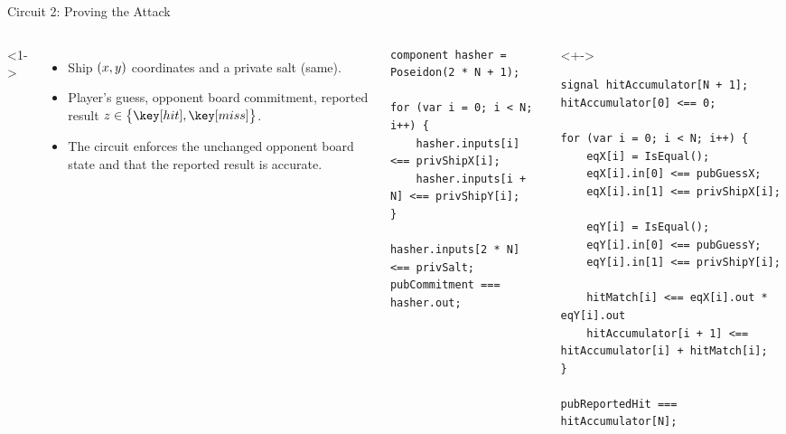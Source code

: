 \begin{frame}[fragile]{Circuit 2: Proving the Attack}
    \begin{columns}<1->
        \begin{itemize}
            \item {} Ship $\left(x, y\right)$ coordinates and a private salt (same).
            \item {} Player's guess, opponent board commitment, reported result $z \in \set{\hit, \miss}$.
            \item The circuit enforces the unchanged opponent board state and that the reported result is accurate.
        \end{itemize}
        \begin{verbatim}
component hasher = Poseidon(2 * N + 1);

for (var i = 0; i < N; i++) {
    hasher.inputs[i] <== privShipX[i];
    hasher.inputs[i + N] <== privShipY[i];
}

hasher.inputs[2 * N] <== privSalt;
pubCommitment === hasher.out;
        \end{verbatim}
        \vspace{-1em}
        \begin{uncoverenv}<+->
            \begin{verbatim}
signal hitAccumulator[N + 1];
hitAccumulator[0] <== 0;

for (var i = 0; i < N; i++) {
    eqX[i] = IsEqual();
    eqX[i].in[0] <== pubGuessX;
    eqX[i].in[1] <== privShipX[i];
    
    eqY[i] = IsEqual();
    eqY[i].in[0] <== pubGuessY;
    eqY[i].in[1] <== privShipY[i];

    hitMatch[i] <== eqX[i].out * eqY[i].out
    hitAccumulator[i + 1] <== hitAccumulator[i] + hitMatch[i];
}

pubReportedHit === hitAccumulator[N];
            \end{verbatim}
        \end{uncoverenv}
    \end{columns}
\end{frame}

